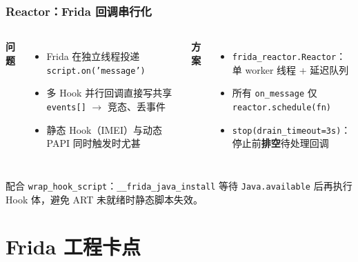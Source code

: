 \documentclass[AutoFakeBold,AutoFakeSlant]{beamer}
\newcommand{\arrown}{\ensuremath{\rightarrow}}
\begin{document}
\begin{frame}
    \frametitle{Reactor：Frida 回调串行化}
    \small
    \begin{columns}[T]
        \textbf{问题}
        \begin{itemize}
            \item Frida 在独立线程投递 \texttt{script.on('message')}
            \item 多 Hook 并行回调直接写共享 \texttt{events{[]}} \arrown{} 竞态、丢事件
            \item 静态 Hook（IMEI）与动态 PAPI 同时触发时尤甚
        \end{itemize}
        \textbf{方案}
        \begin{itemize}
            \item \texttt{frida\_reactor.Reactor}：单 worker 线程 + 延迟队列
            \item 所有 \texttt{on\_message} 仅 \texttt{reactor.schedule(fn)}
            \item \texttt{stop(drain\_timeout=3s)}：停止前\textbf{排空}待处理回调
        \end{itemize}
    \end{columns}
    \vspace{0.5em}
    \centering
    \vspace{0.3em}
    \scriptsize
    配合 \texttt{wrap\_hook\_script}：\texttt{\_\_frida\_java\_install} 等待 \texttt{Java.available} 后再执行 Hook 体，避免 ART 未就绪时静态脚本失效。
\end{frame}

\section{Frida 工程卡点}
\end{document}

